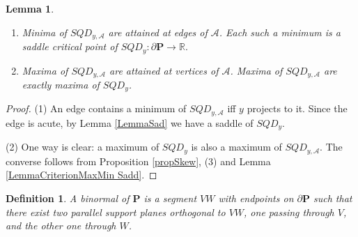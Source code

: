 \documentclass[12pt]{amsart}
\newtheorem{lemma}{Lemma}
\newtheorem*{main lemma}{The main lemma}
\newtheorem{definition}{Definition}
\begin{document}
\begin{lemma}\label{LemmaSadAcute}
\begin{enumerate}
  \item Minima of  $SQD_{y,\mathcal{A}}$ are attained at edges of $\mathcal{A}$. Each such a minimum is a saddle critical point of \newline $SQD_y: \partial \mathbf{P}\rightarrow \mathbb{R}.$
  \item  Maxima of  $SQD_{y,\mathcal{A}}$ are attained at vertices of $\mathcal{A}$. Maxima of  $SQD_{y,\mathcal{A}}$ are exactly maxima of $SQD_y$.
\end{enumerate}
\end{lemma}
\begin{proof}
  (1) An edge contains a minimum of  $SQD_{y,\mathcal{A}}$ iff $y$ projects to it. Since the edge is acute, by Lemma \ref{LemmaSad} we have a saddle of $SQD_y$.
  
 (2) One way is clear:  a maximum of $SQD_y$ is  also a maximum of $SQD_{y,\mathcal{A}}$.
   The converse follows from Proposition \ref{propSkew}, (3) and Lemma \ref{LemmaCriterionMaxMin Sadd}.
\end{proof}

\begin{definition}
  A binormal of $\mathbf{P}$ is a segment $VW$ with endpoints on $\partial \mathbf{P}$ such that there exist two parallel support planes  orthogonal to $VW$, 
  one passing through $V$, and the other one through $W$.
\end{definition}
\end{document}
